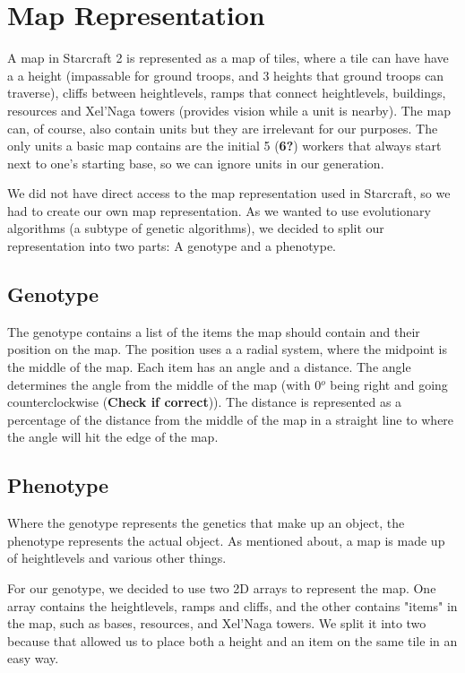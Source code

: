 \section{Map Representation}
\label{MapRepresentation}

A map in Starcraft 2 is represented as a map of tiles, where a tile can have have a a height (impassable for ground troops, and 3 heights that ground troops can traverse), cliffs between heightlevels, ramps that connect heightlevels, buildings, resources and Xel'Naga towers (provides vision while a unit is nearby). The map can, of course, also contain units but they are irrelevant for our purposes. The only units a basic map contains are the initial 5 (\textbf{6?}) workers that always start next to one's starting base, so we can ignore units in our generation.

We did not have direct access to the map representation used in Starcraft, so we had to create our own map representation. As we wanted to use evolutionary algorithms (a subtype of genetic algorithms), we decided to split our representation into two parts: A genotype and a phenotype.

\subsection{Genotype}
\label{MapRepresentation_Genotype}

The genotype contains a list of the items the map should contain and their position on the map. The position uses a a radial system, where the midpoint is the middle of the map. Each item has an angle and a distance. The angle determines the angle from the middle of the map (with 0$^o$ being right and going counterclockwise (\textbf{Check if correct})). The distance is represented as a percentage of the distance from the middle of the map in a straight line to where the angle will hit the edge of the map.

\subsection{Phenotype}
\label{MapRepresentation_Phenotype}

Where the genotype represents the genetics that make up an object, the phenotype represents the actual object. As mentioned about, a map is made up of heightlevels and various other things.

For our genotype, we decided to use two 2D arrays to represent the map. One array contains the heightlevels, ramps and cliffs, and the other contains "items" in the map, such as bases, resources, and Xel'Naga towers. We split it into two because that allowed us to place both a height and an item on the same tile in an easy way.

